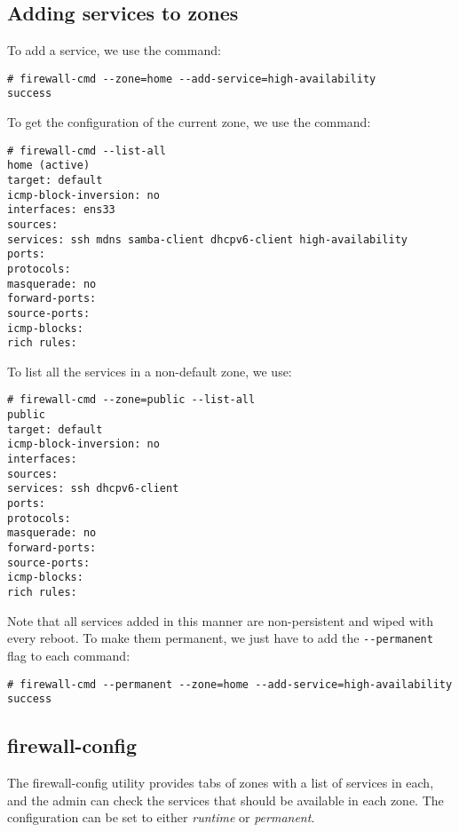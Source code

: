 \subsection{Adding services to zones} 
To add a service, we use the command:

\vspace{-15pt}
\begin{verbatim}
# firewall-cmd --zone=home --add-service=high-availability 
success
\end{verbatim}
\vspace{-10pt}

\noindent
To get the configuration of the current zone, we use the command:

\vspace{-15pt}
\begin{verbatim}
# firewall-cmd --list-all
home (active)
target: default
icmp-block-inversion: no
interfaces: ens33
sources: 
services: ssh mdns samba-client dhcpv6-client high-availability
ports: 
protocols: 
masquerade: no
forward-ports: 
source-ports: 
icmp-blocks: 
rich rules: 
\end{verbatim}
\vspace{-10pt}

\noindent
To list all the services in a non-default zone, we use:

\vspace{-15pt}
\begin{verbatim}
# firewall-cmd --zone=public --list-all
public
target: default
icmp-block-inversion: no
interfaces: 
sources: 
services: ssh dhcpv6-client
ports: 
protocols: 
masquerade: no
forward-ports: 
source-ports: 
icmp-blocks: 
rich rules: 
\end{verbatim}
\vspace{-10pt}

\noindent
Note that all services added in this manner are non-persistent and wiped with every reboot. To make them permanent, we just have to add the \verb|--permanent| flag to each command:

\vspace{-15pt}
\begin{verbatim}
# firewall-cmd --permanent --zone=home --add-service=high-availability 
success
\end{verbatim}
\vspace{-10pt}

\subsection{firewall-config}
The firewall-config utility provides tabs of zones with a list of services in each, and the admin can check the services that should be available in each zone. The configuration can be set to either \textit{runtime} or \textit{permanent}. 